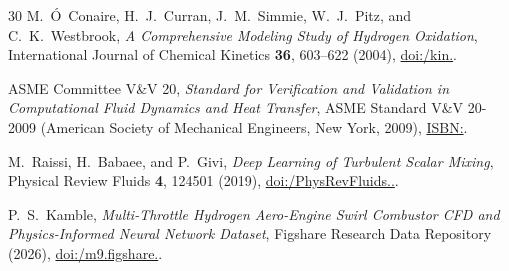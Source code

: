 \documentclass[reprint,aps,prfluids,superscriptaddress,twocolumn,floatfix]{revtex4-2}
\begin{document}
\begin{thebibliography}{30}
 M.~{\'O}~Conaire, H.~J.~Curran, J.~M.~Simmie, W.~J.~Pitz, and C.~K.~Westbrook, \textit{A Comprehensive Modeling Study of Hydrogen Oxidation}, International Journal of Chemical Kinetics \textbf{36}, 603--622 (2004), \href{https://doi.org/10.1002/kin.20036}{doi:/\allowbreak kin.}.

 {ASME Committee V\&V 20}, \textit{Standard for Verification and Validation in Computational Fluid Dynamics and Heat Transfer}, ASME Standard V\&V 20-2009 (American Society of Mechanical Engineers, New York, 2009), \href{https://www.asme.org/codes-standards/find-codes-standards/v-v-20-standard-verification-validation-computational-fluid-dynamics-heat-transfer}{ISBN:}.

 M.~Raissi, H.~Babaee, and P.~Givi, \textit{Deep Learning of Turbulent Scalar Mixing}, Physical Review Fluids \textbf{4}, 124501 (2019), \href{https://doi.org/10.1103/PhysRevFluids.4.124501}{doi:/\allowbreak PhysRevFluids..}.

 P.~S.~Kamble, \textit{Multi-Throttle Hydrogen Aero-Engine Swirl Combustor CFD and Physics-Informed Neural Network Dataset}, Figshare Research Data Repository (2026), \href{https://doi.org/10.6084/m9.figshare.33986668}{doi:/\allowbreak m9.\allowbreak figshare.}.

\end{thebibliography}
\endgroup
\end{document}
